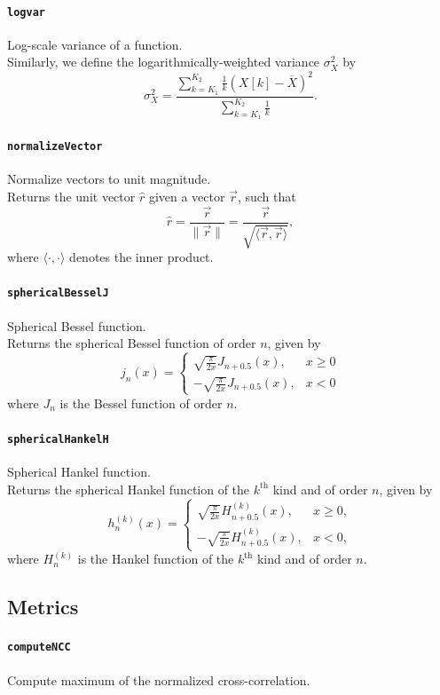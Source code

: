 \documentclass[11pt, oneside]{article}
\newcommand{\function}[1]{\paragraph*{\texttt{#1}}}
\begin{document}
\function{logvar} Log-scale variance of a function. \\
Similarly, we define the logarithmically-weighted variance $\sigma_X^2$ by
\begin{equation}\label{eq:logvar}
\sigma_X^2 = \frac{\displaystyle \sum_{k=K_1}^{K_2} \frac{1}{k} \left( X[k] - \overline{X} \right)^2}{\displaystyle \sum_{k=K_1}^{K_2} \frac{1}{k}}.
\end{equation}

\function{normalizeVector} Normalize vectors to unit magnitude. \\
Returns the unit vector $\hat{r}$ given a vector $\vec{r}$, such that
\begin{equation}
\hat{r} = \frac{\vec{r}}{\|\vec{r}\|} = \frac{\vec{r}}{\sqrt{\langle \vec{r}, \vec{r} \rangle}},
\end{equation}
where $\langle \cdot, \cdot \rangle$ denotes the inner product.

\function{sphericalBesselJ} Spherical Bessel function. \\
Returns the spherical Bessel function of order $n$, given by
\begin{equation}
j_n(x) =
\begin{cases}
\displaystyle \sqrt{\frac{\pi}{2 x}} J_{n+0.5}(x), & x \geq 0 \\
\displaystyle -\sqrt{\frac{\pi}{2 x}} J_{n+0.5}(x), & x < 0
\end{cases}
\end{equation}
where $J_n$ is the Bessel function of order $n$.

\function{sphericalHankelH} Spherical Hankel function. \\
Returns the spherical Hankel function of the $k^\text{th}$ kind and of order $n$, given by
\begin{equation}
h^{(k)}_n(x) =
\begin{cases}
\displaystyle \sqrt{\frac{\pi}{2 x}} H^{(k)}_{n+0.5}(x), & x \geq 0, \\
\displaystyle -\sqrt{\frac{\pi}{2 x}} H^{(k)}_{n+0.5}(x), & x < 0,
\end{cases}
\end{equation}
where $H^{(k)}_n$ is the Hankel function of the $k^\text{th}$ kind and of order $n$.

\subsection{Metrics}

\function{computeNCC} Compute maximum of the normalized cross-correlation. \\
\end{document}
